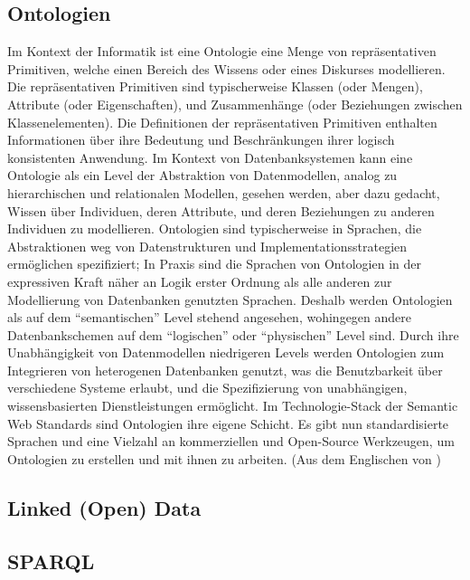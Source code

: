 \subsection{Ontologien}
\begin{definition}[Ontologie]
Im Kontext der Informatik ist eine Ontologie eine Menge von repräsentativen Primitiven, welche einen Bereich des Wissens oder eines Diskurses modellieren.
Die repräsentativen Primitiven sind typischerweise Klassen (oder Mengen), Attribute (oder Eigenschaften), und Zusammenhänge (oder Beziehungen zwischen Klassenelementen).
Die Definitionen der repräsentativen Primitiven enthalten Informationen über ihre Bedeutung und Beschränkungen ihrer logisch konsistenten Anwendung.
Im Kontext von Datenbanksystemen kann eine Ontologie als ein Level der Abstraktion von Datenmodellen, analog zu hierarchischen und relationalen Modellen, gesehen werden, aber dazu gedacht, Wissen über Individuen, deren Attribute, und deren Beziehungen zu anderen Individuen zu modellieren.
Ontologien sind typischerweise in Sprachen, die Abstraktionen weg von Datenstrukturen und Implementationsstrategien ermöglichen spezifiziert;
In Praxis sind die Sprachen von Ontologien in der expressiven Kraft näher an Logik erster Ordnung als alle anderen zur Modellierung von Datenbanken genutzten Sprachen.
Deshalb werden Ontologien als auf dem \enquote{semantischen} Level stehend angesehen, wohingegen andere Datenbankschemen auf dem \enquote{logischen} oder \enquote{physischen} Level sind.
Durch ihre Unabhängigkeit von Datenmodellen niedrigeren Levels werden Ontologien zum Integrieren von heterogenen Datenbanken genutzt, was die Benutzbarkeit über verschiedene Systeme erlaubt, und die Spezifizierung von unabhängigen, wissensbasierten  Dienstleistungen ermöglicht.
Im Technologie-Stack der Semantic Web Standards sind Ontologien ihre eigene Schicht.
Es gibt nun standardisierte Sprachen und eine Vielzahl an kommerziellen und Open-Source Werkzeugen, um Ontologien zu erstellen und mit ihnen zu arbeiten.
(Aus dem Englischen von \citet{ontologygruber})
\end{definition}
\subsection{Linked (Open) Data}

\subsection{SPARQL}

